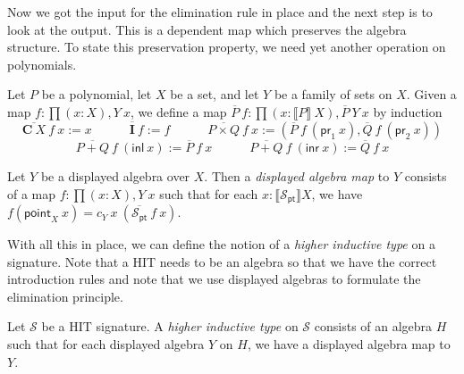 \documentclass[9pt]{entcs}
\newcommand{\term}[1]{\mathsf{#1}}
\newcommand{\constructor}[1]{\mathbf{#1}}
\newcommand{\function}[1]{\mathsf{#1}}
\newcommand{\deprod}[3]{\prod(#1 : #2), #3} %
\newcommand{\0}{\textbf{0}} %
\newcommand{\inl}{\term{inl}} %
\newcommand{\inr}{\term{inr}} %
\newcommand{\prl}{\term{pr}_1} %
\newcommand{\prr}{\term{pr}_2} %
\newcommand{\Def}{:=} %
\newcommand{\C}{\constructor{C}} %
\newcommand{\I}{\constructor{I}} %
\newcommand{\sumP}[2]{#1 + #2} %
\newcommand{\prodP}[2]{#1 \times #2} %
\newcommand{\pt}[0]{\textsf{pt}}
\newcommand{\pointc}[1]{#1_{\pt}} %
\newcommand{\sig}{\mathcal{S}} %
\newcommand{\semP}[1]{\llbracket #1 \rrbracket} %
\newcommand{\constrA}[1]{\function{point}_{#1}} %
\newcommand{\polydact}[2]{\overline{#1} \> #2} %
\newcommand{\polydmap}[2]{\overline{#1} \> #2} %
\newcommand{\remove}[1]{} %
\begin{document}
Now we got the input for the elimination rule in place and the next step is to look at the output.
This is a dependent map which preserves the algebra structure.
To state this preservation property, we need yet another operation on polynomials.

\begin{definition}
Let $P$ be a polynomial, let $X$ be a set, and let $Y$ be a family of sets on $X$.
Given a map $f : \deprod{x}{X}{Y \> x}$, we define a map $\polydmap{P}{f} : \deprod{x}{\semP{P} \> X}{\polydact{P}{Y} \> x}$ by induction
\[
\polydmap{\C \> X}{f} \> x \Def x
\quad \quad \quad
\polydmap{\I}{f} \Def f
\quad \quad \quad
\polydmap{\prodP{P}{Q}}{f} \> x \Def (\polydact{P}{f} \> (\prl \> x) , \polydact{Q}{f} \> (\prr \> x))
\]
\[
\polydmap{\sumP{P}{Q}}{f} \> (\inl \> x) \Def \polydmap{P}{f} \> x
\quad \quad \quad
\polydmap{\sumP{P}{Q}}{f} \> (\inr \> x) \Def \polydmap{Q}{f} \> x
\]
\remove{
\begin{itemize}
	\item $\polydmap{\C \> X}{f} \> x \Def x$;
	\item $\polydmap{\I}{f} \Def f$;
	\item $\polydmap{\sumP{P}{Q}}{f} \> (\inl \> x) \Def \polydmap{P}{f} \> x$;
	\item $\polydmap{\sumP{P}{Q}}{f} \> (\inr \> x) \Def \polydmap{Q}{f} \> x$;
	\item $\polydmap{\prodP{P}{Q}}{f} \> x \Def (\polydact{P}{f} \> (\prl \> x) , \polydact{Q}{f} \> (\prr \> x))$.
\end{itemize}
}
\end{definition}

\begin{definition}
Let $Y$ be a displayed algebra over $X$.
Then a \emph{displayed algebra map} to $Y$ consists of a map $f : \deprod{x}{X}{Y \> x}$ such that for each $x : \semP{\pointc{\sig}}{X}$, we have $f(\constrA{X} \> x) = c_Y \> x \> (\polydmap{\pointc{\sig}}{f} \> x)$.
\end{definition}

With all this in place, we can define the notion of a \emph{higher inductive type} on a signature.
Note that a HIT needs to be an algebra so that we have the correct introduction rules and note that we use displayed algebras to formulate the elimination principle.

\begin{definition}
Let $\sig$ be a HIT signature.
A \emph{higher inductive type} on $\sig$ consists of an algebra $H$ such that for each displayed algebra $Y$ on $H$, we have a displayed algebra map to $Y$.
\end{definition}
\end{document}
